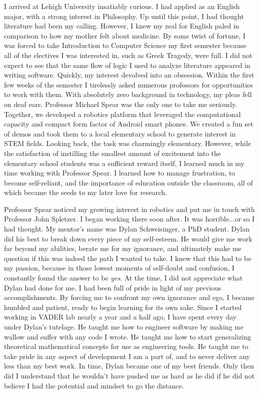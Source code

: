 \documentclass{article}
\begin{document}
I arrived at Lehigh University insatiably curious. I had applied as an English
major, with a strong interest in Philosophy.  Up until this point, I had
thought literature had been my calling. However, I knew my zeal for English
paled in comparison to how my mother felt about medicine. By some twist of
fortune, I was forced to take Introduction to Computer Science my first
semester because all of the electives I was interested in, such as Greek
Tragedy, were full. I did not expect to see that the same flow of logic I used
to analyze literature appeared in writing software. Quickly, my interest
devolved into an obsession.  Within the first few weeks of the semester I
tirelessly asked numerous professors for opportunities to work with them.  With
absolutely zero background in technology, my pleas fell on deaf ears.
Professor Michael Spear was the only one to take me seriously. Together, we
developed a robotics platform that leveraged the computational capacity and
compact form factor of Android smart phones. We created a fun set of demos and
took them to a local elementary school to generate interest in STEM fields.
Looking back, the task was charmingly elementary. However, while the
satisfaction of instilling the smallest amount of excitement into the
elementary school students was a sufficient reward itself, I learned much in my
time working with Professor Spear.  I learned how to manage frustration, to
become self-reliant, and the importance of education outside the classroom, all
of which became the seeds to my later love for research.

Professor Spear noticed my growing interest in robotics and put me in touch
with Professor John Spletzer. I began working there soon after. It was
horrible...or so I had thought. My mentor's name was Dylan Schweisinger, a PhD
student. Dylan did his best to break down every piece of my self-esteem. He
would give me work far beyond my abilities, berate me for my ignorance, and
ultimately make me question if this was indeed the path I wanted to take. I
knew that this had to be my passion, because in those lowest moments of
self-doubt and confusion, I constantly found the answer to be \emph{yes}. At
the time, I did not appreciate what Dylan had done for me. I had been full of
pride in light of my previous accomplishments. By forcing me to confront my own
ignorance and ego, I became humbled and patient, ready to begin learning for
its own sake. Since I started working in VADER lab nearly a year and a half
ago, I have spent every day under Dylan's tutelage.  He taught me how to
engineer software by making me wallow and suffer with any code I wrote. He
taught me how to start generalizing theoretical mathematical concepts for use
as engineering tools. He taught me to take pride in any aspect of development I
am a part of, and to never deliver any less than my best work. In time, Dylan
became one of my best friends. Only then did I understand that he wouldn't have
pushed me as hard as he did if he did not believe I had the potential and
mindset to go the distance.
\end{document}
